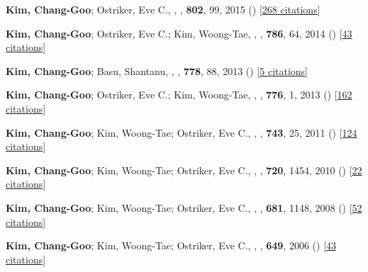\item[{8.}]\textbf{Kim, Chang-Goo}; Ostriker, Eve C., , \apj, \textbf{802}, 99, 2015 () [\href{http://adsabs.harvard.edu/abs/2015ApJ...802...99K}{268 citations}]

\item[{9.}]\textbf{Kim, Chang-Goo}; Ostriker, Eve C.; Kim, Woong-Tae, , \apj, \textbf{786}, 64, 2014 () [\href{http://adsabs.harvard.edu/abs/2014ApJ...786...64K}{43 citations}]

\item[{10.}]\textbf{Kim, Chang-Goo}; Basu, Shantanu, , \apj, \textbf{778}, 88, 2013 () [\href{http://adsabs.harvard.edu/abs/2013ApJ...778...88K}{5 citations}]

\item[{11.}]\textbf{Kim, Chang-Goo}; Ostriker, Eve C.; Kim, Woong-Tae, , \apj, \textbf{776}, 1, 2013 () [\href{http://adsabs.harvard.edu/abs/2013ApJ...776....1K}{162 citations}]

\item[{12.}]\textbf{Kim, Chang-Goo}; Kim, Woong-Tae; Ostriker, Eve C., , \apj, \textbf{743}, 25, 2011 () [\href{http://adsabs.harvard.edu/abs/2011ApJ...743...25K}{124 citations}]

\item[{13.}]\textbf{Kim, Chang-Goo}; Kim, Woong-Tae; Ostriker, Eve C., , \apj, \textbf{720}, 1454, 2010 () [\href{http://adsabs.harvard.edu/abs/2010ApJ...720.1454K}{22 citations}]

\item[{14.}]\textbf{Kim, Chang-Goo}; Kim, Woong-Tae; Ostriker, Eve C., , \apj, \textbf{681}, 1148, 2008 () [\href{http://adsabs.harvard.edu/abs/2008ApJ...681.1148K}{52 citations}]

\item[{15.}]\textbf{Kim, Chang-Goo}; Kim, Woong-Tae; Ostriker, Eve C., , \apj, \textbf{649}, 2006 () [\href{http://adsabs.harvard.edu/abs/2006ApJ...649L..13K}{43 citations}]